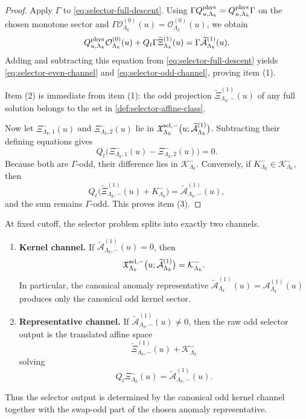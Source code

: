 \documentclass[11pt]{article}
\begin{document}
\begin{proof}
Apply \(\Gamma\) to \eqref{eq:selector-full-descent}.
Using
\(
\Gamma Q^{\rm phys}_{u,\Lambda_k}
=
Q^{\rm phys}_{u,\Lambda_k}\Gamma
\)
on the chosen monotone sector and
\(
\Gamma\mathcal O^{(0)}_{\Lambda_k}(u)=\mathcal O^{(0)}_{\Lambda_k}(u)
\),
we obtain
\[
Q^{\rm phys}_{u,\Lambda_k}\mathcal O^{(0)}_{\Lambda_k}(u)
+
Q_t\Gamma\widetilde{\Xi}^{(1)}_{\Lambda_k}(u)
=
\Gamma\widetilde{\mathcal A}^{(1)}_{\Lambda_k}(u).
\]
Adding and subtracting this equation from \eqref{eq:selector-full-descent} yields
\eqref{eq:selector-even-channel} and \eqref{eq:selector-odd-channel}, proving item (1).

Item (2) is immediate from item (1): the odd projection
\(
\widetilde{\Xi}^{(1)}_{\Lambda_k,-}(u)
\)
of any full solution belongs to the set in
\cref{def:selector-affine-class}.

Now let
\(
\Xi^-_{\Lambda_k,1}(u)
\)
and
\(
\Xi^-_{\Lambda_k,2}(u)
\)
lie in
\(
\mathfrak X_{\Lambda_k}^{{\rm sel},-}
\big(u;\widetilde{\mathcal A}^{(1)}_{\Lambda_k}\big)
\).
Subtracting their defining equations gives
\[
Q_t\big(
\Xi^-_{\Lambda_k,1}(u)-\Xi^-_{\Lambda_k,2}(u)
\big)
=
0.
\]
Because both are \(\Gamma\)-odd, their difference lies in
\(
\mathcal K^-_{\Lambda_k}
\).
Conversely, if
\(
K^-_{\Lambda_k}\in\mathcal K^-_{\Lambda_k}
\),
then
\[
Q_t\big(
\widetilde{\Xi}^{(1)}_{\Lambda_k,-}(u)+K^-_{\Lambda_k}
\big)
=
\widetilde{\mathcal A}^{(1)}_{\Lambda_k,-}(u),
\]
and the sum remains \(\Gamma\)-odd.
This proves item (3).
\end{proof}

\begin{corollary}
\label{cor:selector-two-channels}
At fixed cutoff, the selector problem splits into exactly two channels.
\begin{enumerate}[leftmargin=2em]
\item \textbf{Kernel channel.}
  If
  \(
  \widetilde{\mathcal A}^{(1)}_{\Lambda_k,-}(u)=0
  \),
  then
  \[
  \mathfrak X_{\Lambda_k}^{{\rm sel},-}
  \big(u;\widetilde{\mathcal A}^{(1)}_{\Lambda_k}\big)
  =
  \mathcal K^-_{\Lambda_k}.
  \]
  In particular, the canonical anomaly representative
  \(
  \widetilde{\mathcal A}^{(1)}_{\Lambda_k}(u)=\mathcal A^{(1)}_{\Lambda_k}(u)
  \)
  produces only the canonical odd kernel sector.
\item \textbf{Representative channel.}
  If
  \(
  \widetilde{\mathcal A}^{(1)}_{\Lambda_k,-}(u)\neq 0
  \),
  then the raw odd selector output is the translated affine space
  \[
  \widetilde{\Xi}^{(1)}_{\Lambda_k,-}(u)+\mathcal K^-_{\Lambda_k}
  \]
  solving
  \[
  Q_t\Xi^-_{\Lambda_k}(u)
  =
  \widetilde{\mathcal A}^{(1)}_{\Lambda_k,-}(u).
  \]
\end{enumerate}
Thus the selector output is determined by the canonical odd kernel channel together with the
swap-odd part of the chosen anomaly representative.
\end{corollary}
\end{document}
